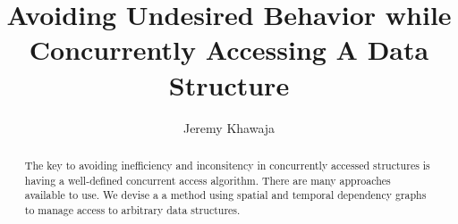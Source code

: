 \documentclass[english]{article}
\begin{document}
	
\hypersetup{
	colorlinks=true, %
	linktoc=all,     %
	linkcolor=blue,  %
}

\onecolumn
\title{Avoiding Undesired Behavior while Concurrently Accessing A Data Structure}
\author{Jeremy Khawaja}
\maketitle

\begin{abstract}
		The key to avoiding inefficiency and inconsitency in concurrently accessed structures is having a well-defined concurrent access algorithm. There are many approaches available to use. We devise a a method using spatial and temporal dependency graphs to manage access to arbitrary data structures.
\end{abstract}
\twocolumn









\onecolumn
\end{document}
